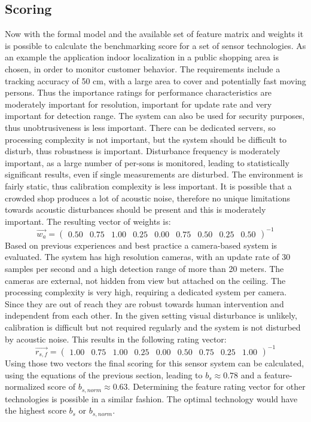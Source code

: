 \subsection{Scoring}
Now with the formal model and the available set of feature matrix and weights it is possible to calculate the benchmarking score for a set of sensor technologies. As an example the application indoor localization in a public shopping area is chosen, in order to monitor customer behavior. The requirements include a tracking accuracy of 50 cm, with a large area to cover and potentially fast moving persons. Thus the importance ratings for performance characteristics are moderately important for resolution, important for update rate and very important for detection range. The system can also be used for security purposes, thus unobtrusiveness is less important. There can be dedicated servers, so processing complexity is not important, but the system should be difficult to disturb, thus robustness is important. Disturbance frequency is moderately important, as a large number of per-sons is monitored, leading to statistically significant results, even if single measurements are disturbed. The environment is fairly static, thus calibration complexity is less important. It is possible that a crowded shop produces a lot of acoustic noise, therefore no unique limitations towards acoustic disturbances should be present and this is moderately important. The resulting vector of weights is:
\begin{equation}
\overrightarrow{w_a}=
\begin{pmatrix}
0.50 & 0.75 & 1.00 & 0.25 & 0.00 & 0.75 & 0.50 & 0.25 & 0.50
\end{pmatrix}^{-1}
\end{equation}
Based on previous experiences and best practice a camera-based system is evaluated. The system has high resolution cameras, with an update rate of 30 samples per second and a high detection range of more than 20 meters. The cameras are external, not hidden from view but attached on the ceiling. The processing complexity is very high, requiring a dedicated system per camera. Since they are out of reach they are robust towards human intervention and independent from each other. In the given setting visual disturbance is unlikely, calibration is difficult but not required regularly and the system is not disturbed by acoustic noise. This results in the following rating vector:
\begin{equation}
\overrightarrow{r_{s,f}}=
\begin{pmatrix}
1.00 & 0.75 & 1.00 & 0.25 & 0.00 & 0.50 & 0.75 & 0.25 & 1.00
\end{pmatrix}^{-1}
\end{equation}
Using those two vectors the final scoring for this sensor system can be calculated, using the equations of the previous section, leading to $b_s \approx 0.78$ and a feature-normalized score of $b_{s,norm} \approx 0.63$. Determining the feature rating vector for other technologies is possible in a similar fashion. The optimal technology would have the highest score $b_s$ or $b_{s,norm}$.
\clearpage
